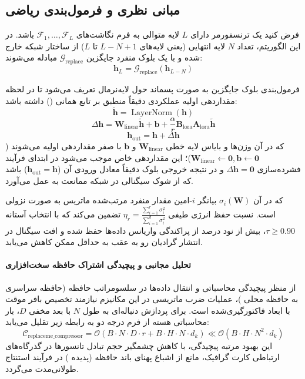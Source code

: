\subsection{مبانی نظری و فرمول‌بندی ریاضی}
فرض کنید یک ترنسفورمر دارای $L$ لایه متوالی به فرم نگاشت‌های $\mathcal{F}_1, \dots, \mathcal{F}_L$ باشد. در این الگوریتم، تعداد $N$ لایه انتهایی (یعنی لایه‌های $L-N+1$ تا $L$) از ساختار شبکه خارج شده و با یک بلوک منفرد جایگزین $\mathcal{G}_{\text{replace}}$ مبادله می‌شوند:
\begin{equation}
\mathbf{h}_{L} = \mathcal{G}_{\text{replace}}(\mathbf{h}_{L-N})
\end{equation}

فرمول‌بندی بلوک جایگزین به صورت پسماند حول لایه‌نرمال تعریف می‌شود تا در لحظه مقداردهی اولیه عملکردی دقیقاً منطبق بر تابع همانی () داشته باشد:
\begin{equation}
\tilde{\mathbf{h}} = \operatorname{LayerNorm}(\mathbf{h})
\end{equation}
\begin{equation}
\Delta \mathbf{h} = \mathbf{W}_{\text{linear}} \tilde{\mathbf{h}} + \mathbf{b} + \frac{\alpha}{r} \mathbf{B}_{\text{lora}} \mathbf{A}_{\text{lora}} \tilde{\mathbf{h}}
\end{equation}
\begin{equation}
\mathbf{h}_{\text{out}} = \mathbf{h} + \Delta \mathbf{h}
\end{equation}
که در آن وزن‌ها و بایاس لایه خطی $\mathbf{W}_{\text{linear}}$ و $\mathbf{b}$ با صفر مقداردهی اولیه می‌شوند ($\mathbf{W}_{\text{linear}} \leftarrow \mathbf{0}, \mathbf{b} \leftarrow \mathbf{0}$)؛ این مقداردهی خاص موجب می‌شود در ابتدای فرآیند فشرده‌سازی $\Delta \mathbf{h} = \mathbf{0}$ و در نتیجه خروجی بلوک دقیقاً معادل ورودی آن ($\mathbf{h}_{\text{out}} = \mathbf{h}$) باشد که از شوک سیگنالی در شبکه ممانعت به عمل می‌آورد.

که در آن $\sigma_i(\mathbf{W})$ بیانگر $i$-امین مقدار منفرد مرتب‌شده ماتریس به صورت نزولی است. نسبت حفظ انرژی طیفی $\eta_r = \frac{\sum_{i=1}^r \sigma_i^2}{\sum_{i=1}^{d} \sigma_i^2}$ تضمین می‌کند که با انتخاب آستانه $\tau \ge 0.90$، بیش از نود درصد از پراکندگی واریانس داده‌ها حفظ شده و افت سیگنال در انتشار گرادیان رو به عقب به حداقل ممکن کاهش می‌یابد.

\paragraph{تحلیل مجانبی و پیچیدگی اشتراک حافظه سخت‌افزاری}
از منظر پیچیدگی محاسباتی و انتقال داده‌ها در سلسومراتب حافظه (حافظه سراسری  به حافظه محلی )، عملیات ضرب ماتریسی در این مکانیزم نیازمند تخصیص بافر موقت با ابعاد فاکتورگیری‌شده است. برای پردازش دنباله‌ای به طول $N$ با بعد مخفی $D$، بار محاسباتی هسته از فرم درجه دو به رابطه زیر تقلیل می‌یابد:
\begin{equation}
\label{eq:complexity_replaceme_compressor}
\mathcal{C}_{\text{replaceme\_compressor}} = \mathcal{O}\left( B \cdot N \cdot D \cdot r + B \cdot H \cdot N \cdot d_k \right) \ll \mathcal{O}\left( B \cdot H \cdot N^2 \cdot d_k \right)
\end{equation}
این بهبود مرتبه پیچیدگی، با کاهش چشمگیر حجم تبادل تانسورها در گذرگاه‌های ارتباطی کارت گرافیک، مانع از اشباع پهنای باند حافظه (پدیده ) در فرآیند استنتاج طولانی‌مدت می‌گردد.
